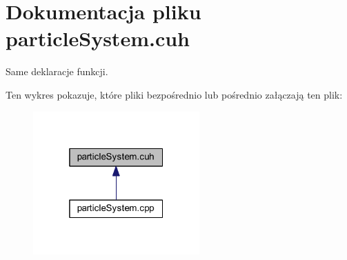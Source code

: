 \hypertarget{particle_system_8cuh}{\section{Dokumentacja pliku particle\-System.\-cuh}
\label{particle_system_8cuh}
}


Same deklaracje funkcji.  


Ten wykres pokazuje, które pliki bezpośrednio lub pośrednio załączają ten plik\-:\nopagebreak
\begin{figure}[H]
\begin{center}
\leavevmode
\includegraphics[width=181pt]{particle_system_8cuh__dep__incl}
\end{center}
\end{figure}
